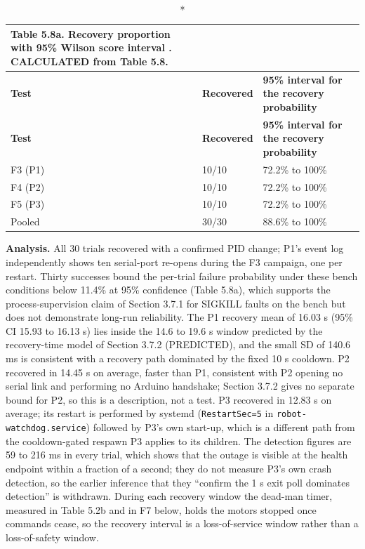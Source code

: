 \begin{center}
\begin{longtable}{|l|l|l|}
\caption*{Table 5.8a. Recovery proportion with 95\% Wilson score interval \cite{wilson1927}. CALCULATED from Table 5.8.}
\addcontentsline{lot}{table}{\protect\numberline{5.8a}Recovery proportion with 95\% Wilson score interval \cite{wilson1927}. CALCULATED from Table 5.8.}
\\
\hline
\textbf{Test} & \textbf{Recovered} & \textbf{95\% interval for the recovery probability} \\
\hline
\endfirsthead
\hline
\textbf{Test} & \textbf{Recovered} & \textbf{95\% interval for the recovery probability} \\
\hline
\endhead
F3 (P1) & 10/10 & 72.2\% to 100\% \\
\hline
F4 (P2) & 10/10 & 72.2\% to 100\% \\
\hline
F5 (P3) & 10/10 & 72.2\% to 100\% \\
\hline
Pooled & 30/30 & 88.6\% to 100\% \\
\hline
\end{longtable}
\end{center}

\textbf{Analysis.} All 30 trials recovered with a confirmed PID change; P1's event log independently shows ten serial-port re-opens during the F3 campaign, one per restart. Thirty successes bound the per-trial failure probability under these bench conditions below 11.4\% at 95\% confidence (Table 5.8a), which supports the process-supervision claim of Section 3.7.1 for SIGKILL faults on the bench but does not demonstrate long-run reliability. The P1 recovery mean of 16.03 s (95\% CI 15.93 to 16.13 s) lies inside the 14.6 to 19.6 s window predicted by the recovery-time model of Section 3.7.2 (PREDICTED), and the small SD of 140.6 ms is consistent with a recovery path dominated by the fixed 10 s cooldown. P2 recovered in 14.45 s on average, faster than P1, consistent with P2 opening no serial link and performing no Arduino handshake; Section 3.7.2 gives no separate bound for P2, so this is a description, not a test. P3 recovered in 12.83 s on average; its restart is performed by systemd (\texttt{RestartSec=5} in \texttt{robot-watchdog.service}) followed by P3's own start-up, which is a different path from the cooldown-gated respawn P3 applies to its children. The detection figures are 59 to 216 ms in every trial, which shows that the outage is visible at the health endpoint within a fraction of a second; they do not measure P3's own crash detection, so the earlier inference that they ``confirm the 1 s exit poll dominates detection'' is withdrawn. During each recovery window the dead-man timer, measured in Table 5.2b and in F7 below, holds the motors stopped once commands cease, so the recovery interval is a loss-of-service window rather than a loss-of-safety window.

